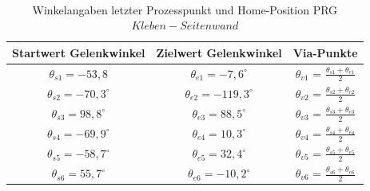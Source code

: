 \\
\begin{table}
\centering
\begin{tabular}{|c|c|c|}
	\hline
	Startwert Gelenkwinkel&  Zielwert Gelenkwinkel&  Via-Punkte\\
	\hline
	$\theta_{s1} = -53,8$&  $\theta_{e1} = -7,6^{\circ}$  &$\theta_{v1}$ = $\tfrac{\theta_{s1}+\theta_{e1}}{2}$  \\
	\hline
	$\theta_{s2} = -70,3^{\circ}$&  $\theta_{e2} = -119,3^{\circ}$    &$\theta_{v2}$ = $\tfrac{\theta_{s2}+\theta_{e2}}{2}$  \\
	\hline
	$\theta_{s3} = 98,8^{\circ}$&  $\theta_{e3} = 88,5^{\circ}$&$\theta_{v3}$ = $\tfrac{\theta_{s3}+\theta_{e3}}{2}$  \\
	\hline
	$\theta_{s4} = -69,9^{\circ}$&  $\theta_{e4} = 10,3^{\circ}$&$\theta_{v4}$ = $\tfrac{\theta_{s4}+\theta_{e4}}{2}$  \\
	\hline
	$\theta_{s5} = -58,7^{\circ}$&  $\theta_{e5} = 32,4^{\circ}$  &$\theta_{v5}$ = $\tfrac{\theta_{s5}+\theta_{e5}}{2}$  \\
	\hline
	$\theta_{s6} = 55,7^{\circ}$&  $\theta_{e6} = -10,2^{\circ}$&$\theta_{v6}$ = $\tfrac{\theta_{s6}+\theta_{e6}}{2}$  \\
	\hline
\end{tabular}
\caption{Winkelangaben letzter Prozesspunkt und Home-Position PRG $Kleben-Seitenwand$}
\label{tab:simu}
\end{table}
\\
